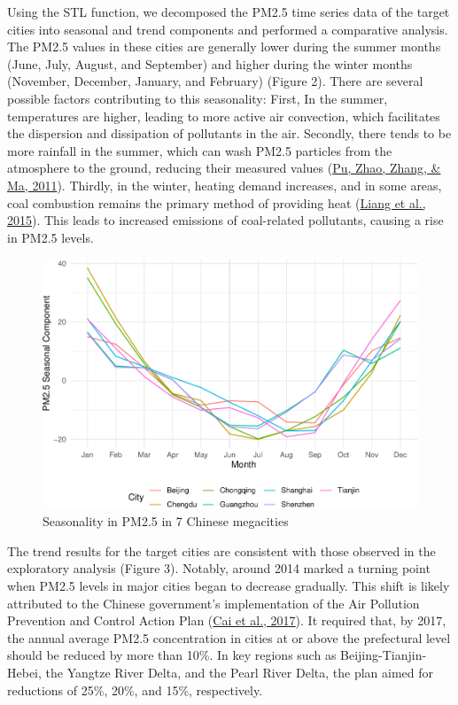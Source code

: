 \documentclass[
  12pt,
]{article}
\begin{document}
Using the STL function, we decomposed the PM2.5 time series data of the
target cities into seasonal and trend components and performed a
comparative analysis. The PM2.5 values in these cities are generally
lower during the summer months (June, July, August, and September) and
higher during the winter months (November, December, January, and
February) (Figure 2). There are several possible factors contributing to
this seasonality: First, In the summer, temperatures are higher, leading
to more active air convection, which facilitates the dispersion and
dissipation of pollutants in the air. Secondly, there tends to be more
rainfall in the summer, which can wash PM2.5 particles from the
atmosphere to the ground, reducing their measured values
(\protect\hyperlink{ref-rain}{Pu, Zhao, Zhang, \& Ma, 2011}). Thirdly,
in the winter, heating demand increases, and in some areas, coal
combustion remains the primary method of providing heat
(\protect\hyperlink{ref-heating}{Liang et al., 2015}). This leads to
increased emissions of coal-related pollutants, causing a rise in PM2.5
levels.

\begin{figure}
\centering
\includegraphics{LiFangRenZhang_ENV872_Project_files/figure-latex/seasonal figure-1.pdf}
\caption{Seasonality in PM2.5 in 7 Chinese megacities}
\end{figure}

The trend results for the target cities are consistent with those
observed in the exploratory analysis (Figure 3). Notably, around 2014
marked a turning point when PM2.5 levels in major cities began to
decrease gradually. This shift is likely attributed to the Chinese
government's implementation of the Air Pollution Prevention and Control
Action Plan (\protect\hyperlink{ref-plan}{Cai et al., 2017}). It
required that, by 2017, the annual average PM2.5 concentration in cities
at or above the prefectural level should be reduced by more than 10\%.
In key regions such as Beijing-Tianjin-Hebei, the Yangtze River Delta,
and the Pearl River Delta, the plan aimed for reductions of 25\%, 20\%,
and 15\%, respectively.
\end{document}
